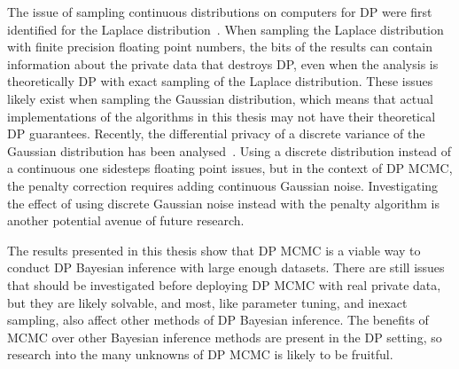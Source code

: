 \documentclass[english,twoside,openright]{HYgraduMLDS}
\begin{document}
The issue of sampling continuous distributions on computers for DP were first
identified for the Laplace distribution~\cite{Mir12}. When sampling the Laplace
distribution with finite precision floating point numbers, the bits of the
results can contain information about the private data that destroys DP, even
when the analysis is theoretically DP with exact sampling of the Laplace
distribution. These issues likely exist when sampling the Gaussian distribution,
which means that actual implementations of the algorithms in this thesis may
not have their theoretical DP guarantees. Recently, the differential privacy
of a discrete variance of the Gaussian distribution has been
analysed~\cite{C0S20}. Using a discrete distribution instead of a continuous one
sidesteps floating point issues, but in the context of DP MCMC, the penalty
correction requires adding continuous Gaussian noise. Investigating the effect
of using discrete Gaussian noise instead with the penalty algorithm is another
potential avenue of future research.

The results presented in this thesis show that DP MCMC is a viable way to
conduct DP Bayesian inference with large enough datasets. There are still
issues that should be investigated before deploying DP MCMC with real
private data, but they are likely solvable, and most, like parameter tuning,
and inexact sampling, also affect other methods of DP Bayesian inference.
The benefits of MCMC over other Bayesian inference methods are present in the
DP setting, so research into the many unknowns of DP MCMC is likely to be
fruitful.


\cleardoublepage %


\end{document}
